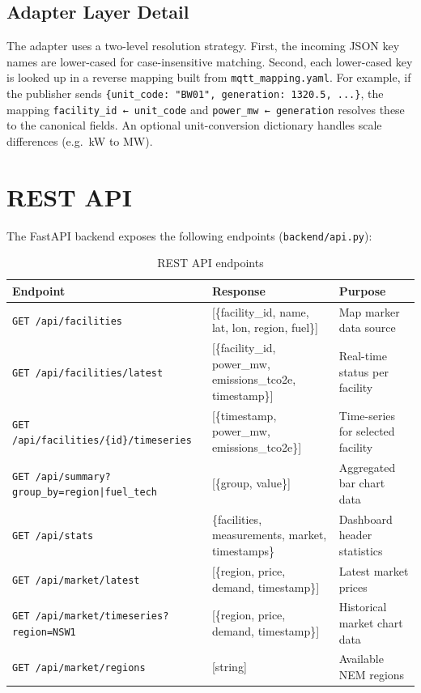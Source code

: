 \documentclass[11pt,a4paper]{article}
\begin{document}
\subsection{Adapter Layer Detail}

The adapter uses a two-level resolution strategy. First, the incoming JSON key names are lower-cased for case-insensitive matching. Second, each lower-cased key is looked up in a reverse mapping built from \texttt{mqtt\_mapping.yaml}. For example, if the publisher sends \texttt{\{unit\_code: "BW01", generation: 1320.5, ...\}}, the mapping \texttt{facility\_id ← unit\_code} and \texttt{power\_mw ← generation} resolves these to the canonical fields. An optional unit-conversion dictionary handles scale differences (e.g.\ kW to MW).

\section{REST API}

The FastAPI backend exposes the following endpoints (\texttt{backend/api.py}):

\begin{table}[H]
\centering
\caption{REST API endpoints}
\begin{tabular}{lll}
\toprule
\textbf{Endpoint} & \textbf{Response} & \textbf{Purpose} \\
\midrule
\texttt{GET /api/facilities} & {}[\{facility\_id, name, lat, lon, region, fuel\}] & Map marker data source \\
\texttt{GET /api/facilities/latest} & {}[\{facility\_id, power\_mw, emissions\_tco2e, timestamp\}] & Real-time status per facility \\
\texttt{GET /api/facilities/\{id\}/timeseries} & {}[\{timestamp, power\_mw, emissions\_tco2e\}] & Time-series for selected facility \\
\texttt{GET /api/summary?group\_by=region|fuel\_tech} & {}[\{group, value\}] & Aggregated bar chart data \\
\texttt{GET /api/stats} & \{facilities, measurements, market, timestamps\} & Dashboard header statistics \\
\texttt{GET /api/market/latest} & {}[\{region, price, demand, timestamp\}] & Latest market prices \\
\texttt{GET /api/market/timeseries?region=NSW1} & {}[\{region, price, demand, timestamp\}] & Historical market chart data \\
\texttt{GET /api/market/regions} & {}[string] & Available NEM regions \\
\bottomrule
\end{tabular}
\end{table}
\end{document}
